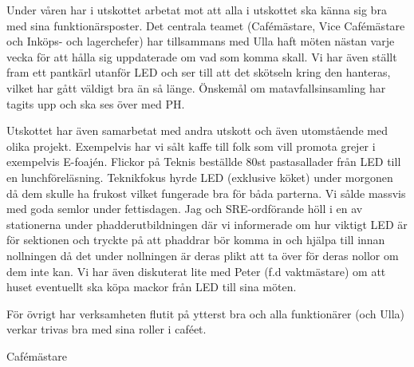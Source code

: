 \documentclass[../_main/handlingar.tex]{subfiles}
\begin{document}
Under våren har i utskottet arbetat mot att alla i utskottet ska känna sig bra med sina funktionärsposter. Det centrala teamet (Cafémästare, Vice Cafémästare och Inköps- och lagerchefer) har tillsammans med Ulla haft möten nästan varje vecka för att hålla sig uppdaterade om vad som komma skall. Vi har även ställt fram ett pantkärl utanför LED och ser till att det skötseln kring den hanteras, vilket har gått väldigt bra än så länge. Önskemål om matavfallsinsamling har tagits upp och ska ses över med PH.

Utskottet har även samarbetat med andra utskott och även utomstående med olika projekt. Exempelvis har vi sålt kaffe till folk som vill promota grejer i exempelvis E-foajén. Flickor på Teknis beställde 80st pastasallader från LED till en lunchföreläsning. Teknikfokus hyrde LED (exklusive köket) under morgonen då dem skulle ha frukost vilket fungerade bra för båda parterna. Vi sålde massvis med goda semlor under fettisdagen. Jag och SRE-ordförande höll i en av stationerna under phadderutbildningen där vi informerade om hur viktigt LED är för sektionen och tryckte på att phaddrar bör komma in och hjälpa till innan nollningen då det under nollningen är deras plikt att ta över för deras nollor om dem inte kan. Vi har även diskuterat lite med Peter (f.d vaktmästare) om att huset eventuellt ska köpa mackor från LED till sina möten.

För övrigt har verksamheten flutit på ytterst bra och alla funktionärer (och Ulla) verkar trivas bra med sina roller i caféet.

\begin{signatures}{1}
    \mvh
    \signature{Daniel Bakic}{Cafémästare}
\end{signatures}
\end{document}
